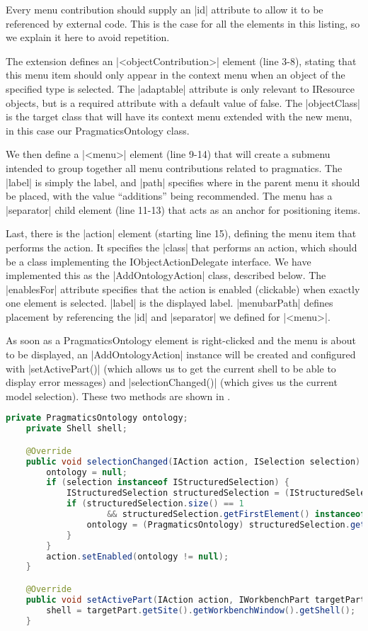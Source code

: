 Every menu contribution should supply an |id| attribute to allow it to be
referenced by external code. This is the case for all the elements in this
listing, so we explain it here to avoid repetition.

The extension defines an
|<objectContribution>| element (line 3-8), stating that this menu item should
only appear in the context menu when an object of the specified type is selected. The
|adaptable| attribute is only relevant to IResource objects, but is a required
attribute with a default value of false. The |objectClass| is the
target class that will have its context menu extended with the new menu, in this
case our PragmaticsOntology class.

We then define a |<menu>| element (line 9-14) that will create a submenu
intended to group together all menu contributions related to pragmatics. The
|label| is simply the label, and |path| specifies where in the parent menu it
should be placed, with the value ``additions'' being recommended. The menu has
a |separator| child element (line 11-13) that acts as an anchor for positioning
items.

Last, there is the |action| element (starting line 15), defining the menu item
that performs the action. It specifies the |class| that performs an action, which should be a
class implementing the IObjectActionDelegate interface. We have implemented this
as the |AddOntologyAction| class, described below. The |enablesFor| attribute
specifies that the action is enabled (clickable) when exactly one element is
selected. |label| is the displayed label. |menubarPath| defines
placement by referencing the |id| and |separator| we defined for |<menu>|.

As soon as a PragmaticsOntology element is right-clicked and the menu is about
to be displayed, an |AddOntologyAction| instance will be created and configured
with |setActivePart()| (which allows us to get the current shell to be able to display error messages)
and |selectionChanged()| (which gives us the current model selection). These two
methods are shown in .


\begin{lstlisting}[language=Java,float,label=lst:AddOntologyAction_config,
caption=AddOntologyAction setActivePart() and selectionChanged()]
	private PragmaticsOntology ontology;
	private Shell shell;

	@Override
	public void selectionChanged(IAction action, ISelection selection) {
		ontology = null;
		if (selection instanceof IStructuredSelection) {
			IStructuredSelection structuredSelection = (IStructuredSelection) selection;
			if (structuredSelection.size() == 1
					&& structuredSelection.getFirstElement() instanceof PragmaticsOntology) {
				ontology = (PragmaticsOntology) structuredSelection.getFirstElement();
			}
		}
		action.setEnabled(ontology != null);
	}

	@Override
	public void setActivePart(IAction action, IWorkbenchPart targetPart) {
		shell = targetPart.getSite().getWorkbenchWindow().getShell();
	}
\end{lstlisting}

